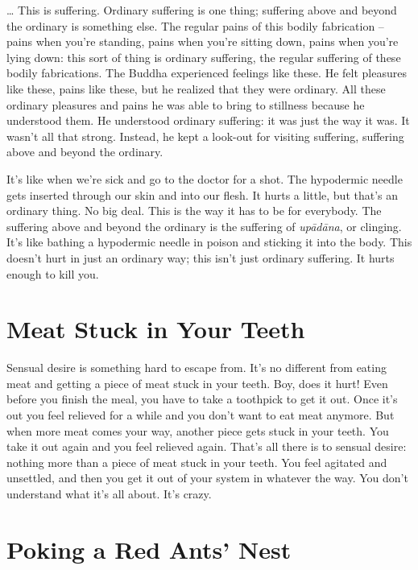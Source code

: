 \ldots{} This is suffering. Ordinary suffering is one thing; suffering above and beyond the ordinary is something else. The regular pains of this bodily fabrication -- pains when you're standing, pains when you're sitting down, pains when you're lying down: this sort of thing is ordinary suffering, the regular suffering of these bodily fabrications. The Buddha experienced feelings like these. He felt pleasures like these, pains like these, but he realized that they were ordinary. All these ordinary pleasures and pains he was able to bring to stillness because he understood them. He understood ordinary suffering: it was just the way it was. It wasn't all that strong. Instead, he kept a look-out for visiting suffering, suffering above and beyond the ordinary. 

It's like when we're sick and go to the doctor for a shot. The hypodermic needle gets inserted through our skin and into our flesh. It hurts a little, but that's an ordinary thing. No big deal. This is the way it has to be for everybody. The suffering above and beyond the ordinary is the suffering of \textit{up\=ad\=ana}, or clinging. It's like bathing a hypodermic needle in poison and sticking it into the body. This doesn't hurt in just an ordinary way; this isn't just ordinary suffering. It hurts enough to kill you.

\clearpage

\section{Meat Stuck in Your Teeth}

Sensual desire is something hard to escape from. It's no different from eating meat and getting a piece of meat stuck in your teeth. Boy, does it hurt! Even before you finish the meal, you have to take a toothpick to get it out. Once it's out you feel relieved for a while and you don't want to eat meat anymore. But when more meat comes your way, another piece gets stuck in your teeth. You take it out again and you feel relieved again. That's all there is to sensual desire: nothing more than a piece of meat stuck in your teeth. You feel agitated and unsettled, and then you get it out of your system in whatever the way. You don't understand what it's all about. It's crazy.

\section{Poking a Red Ants' Nest}

